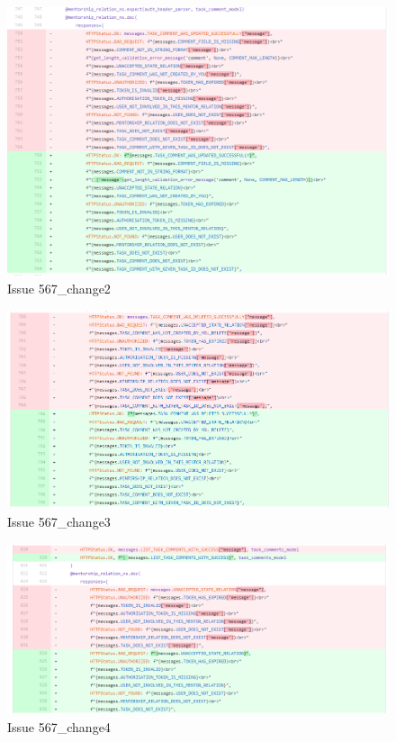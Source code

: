 \documentclass{article}
\begin{document}
\begin{figure}[tph!]
\centerline{\includegraphics[totalheight=13cm, width=16cm]{567Changes_2.png}}
    \caption{Issue 567\_change2}
    \label{fig:verticalcell}
\end{figure}
\begin{figure}[tph!]
\centerline{\includegraphics[totalheight=13cm, width=16cm]{567Changes_3.png}}
    \caption{Issue 567\_change3}
    \label{fig:verticalcell}
\end{figure}
\begin{figure}[tph!]
\centerline{\includegraphics[totalheight=12cm, width=16cm]{567Changes_4.png}}
    \caption{Issue 567\_change4}
    \label{fig:verticalcell}
\end{figure}
\end{document}
